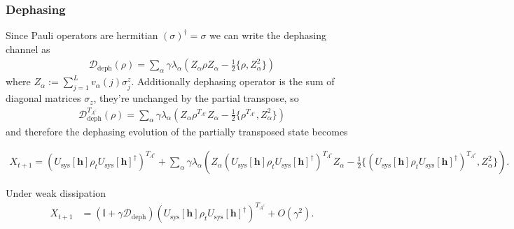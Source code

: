 \documentclass[aps,pra,reprint,amsmath,amssymb]{revtex4-2}
\newcommand{\Usys}[0]{U_{\text{sys}}[\bm{h}]}
\begin{document}
\subsubsection{Dephasing}
Since Pauli operators are hermitian $(\sigma)^\dagger =\sigma$ we can write the dephasing channel as 
\begin{align}
    \mathcal{D}_{\text{deph}}(\rho)=\sum_\alpha \gamma \lambda_\alpha \left(Z_\alpha\rho Z_\alpha-\frac{1}{2}\{\rho,Z_\alpha^2\}\right)
\end{align}
where $Z_\alpha := \sum_{j=1}^L v_\alpha(j)\sigma^z_j$.
Additionally dephasing operator is the sum of diagonal matrices $\sigma_z$, they're unchanged by the partial transpose, so
\begin{align}
\mathcal{D}_{\text{deph}}^{T_{A^c}}(\rho)= \sum_\alpha \gamma \lambda_\alpha \left(Z_\alpha\rho^{T_{A^c}} Z_\alpha-\frac{1}{2}\{\rho^{T_{A^c}},Z_\alpha^2\}\right) 
\end{align}
and therefore the dephasing evolution of the partially transposed state becomes
\begin{widetext}
\begin{align}
    X_{t+1}= \left(\Usys\rho_t \Usys^{\dagger}\right)^{T_{A^c}}
    +\sum_\alpha \gamma \lambda_\alpha \left(Z_\alpha\left(\Usys\rho_t\Usys^\dagger\right)^{T_{A^c}} Z_\alpha-\frac{1}{2}\{\left(\Usys\rho_t\Usys^\dagger\right)^{T_{A^c}},Z_\alpha^2\}\right).
\end{align}
\end{widetext}
Under weak dissipation 
\begin{align}
    X_{t+1}&= \left(\mathbb{I}+\gamma\mathcal{D}_{\text{deph}}\right)\left(\Usys\rho_t\Usys^\dagger\right)^{T_{A^c}}+O(\gamma^2).
\end{align}
\end{document}
